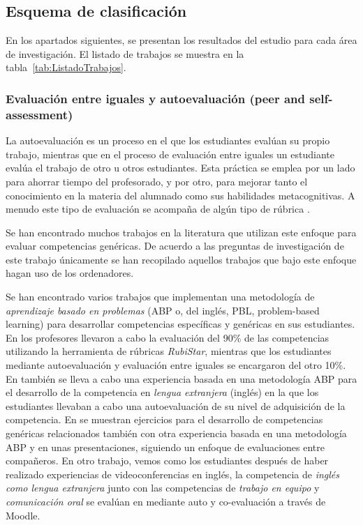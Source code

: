 \subsection{Esquema de clasificación}

En los apartados siguientes, se presentan los resultados del estudio para cada área de investigación. El listado de trabajos se muestra en la tabla~\ref{tab:ListadoTrabajos}.

\subsubsection{Evaluación entre iguales y autoevaluación (peer and self-assessment)}

La autoevaluación es un proceso en el que los estudiantes evalúan su propio trabajo, mientras que  en el proceso de evaluación entre iguales un estudiante evalúa el trabajo de otro u otros estudiantes. Esta práctica se emplea por un lado para ahorrar tiempo del profesorado, y por otro, para mejorar tanto el conocimiento en la materia del alumnado como sus habilidades metacognitivas. A menudo este tipo de evaluación se acompaña de algún tipo de rúbrica \cite{malehorn1994ten}.

Se han encontrado muchos trabajos en la literatura que utilizan este enfoque para evaluar competencias genéricas. De acuerdo a las preguntas de investigación de este trabajo únicamente se han recopilado aquellos trabajos que bajo este enfoque hagan uso de los ordenadores.

Se han encontrado varios trabajos que implementan una metodología de \emph{aprendizaje basado en problemas} (ABP o, del inglés, PBL, problem-based learning) para desarrollar competencias específicas y genéricas en sus estudiantes. En \cite{lasa2013problem} los profesores llevaron a cabo la evaluación del 90\% de las competencias utilizando la herramienta de rúbricas \emph{RubiStar}, mientras que los estudiantes mediante autoevaluación y evaluación entre iguales se encargaron del otro 10\%. En \cite{renau2010teaching} también se lleva a cabo una experiencia basada en una metodología ABP para el desarrollo de la competencia en \emph{lengua extranjera} (inglés) en la que los estudiantes llevaban a cabo una autoevaluación de su nivel de adquisición de la competencia. En \cite{johnson2002encouraging} se muestran ejercicios para el desarrollo de competencias genéricas relacionados también con otra experiencia basada en una metodología ABP y en unas presentaciones, siguiendo un enfoque de evaluaciones entre compañeros. En otro trabajo, vemos como los estudiantes después de haber realizado experiencias de videoconferencias en inglés, la competencia de \emph{inglés como lengua extranjera} junto con las competencias de \emph{trabajo en equipo} y \emph{comunicación oral} se evalúan en \cite{masip2013self} mediante auto y co-evaluación a través de Moodle.

